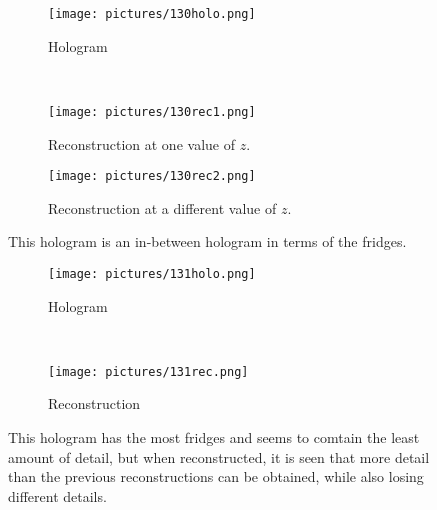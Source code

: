 \begin{figure}[ht!]
    \begin{center}

        \begin{subfigure}[t]{0.4\textwidth}
            \label{fig:130holo}
            \texttt{[image: pictures/130holo.png]}
            \caption{Hologram}
        \end{subfigure}
        \\
        \begin{subfigure}[t]{0.4\textwidth}
            \label{fig:130rec1}
            \texttt{[image: pictures/130rec1.png]}
            \caption{Reconstruction at one value of $z$.}
        \end{subfigure}
                \hspace*{\fill}
%
        \begin{subfigure}[t]{0.4\textwidth}
            \label{fig:130rec2}
            \texttt{[image: pictures/130rec2.png]}
            \caption{Reconstruction at a different value of $z$.}
        \end{subfigure}


    \end{center}
    \caption{%
        This hologram is an in-between hologram in terms of the fridges.
    }%
    \label{fig:130}
\end{figure}


\begin{figure}[ht!]
    \begin{center}

        \begin{subfigure}[t]{0.4\textwidth}
            \label{fig:131holo}
            \texttt{[image: pictures/131holo.png]}
            \caption{Hologram}
        \end{subfigure}
        \\
        \begin{subfigure}[t]{\textwidth}
            \label{fig:131rec}
            \texttt{[image: pictures/131rec.png]}
            \caption{Reconstruction}
        \end{subfigure}


    \end{center}
    \caption{%
        This hologram has the most fridges and seems to comtain the least
        amount of detail, but when reconstructed, it is seen that more detail
        than the previous reconstructions can be obtained, while also losing
        different details.
    }%
    \label{fig:131}
\end{figure}

